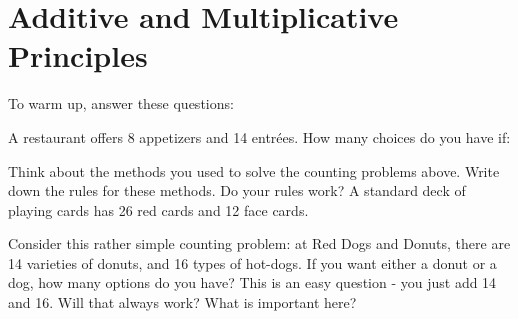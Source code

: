 \documentclass[12pt]{article}
\begin{document}
\newpage
\section{Additive and Multiplicative Principles}

\begin{activity}
To warm up, answer these questions:
\begin{questions}
\question A restaurant offers 8 appetizers and 14 entr\'ees.  How many choices do you have if:
\question Think about the methods you used to solve the counting problems above.  Write down the rules for these methods.
\question Do your rules work?  A standard deck of playing cards has 26 red cards and 12 face cards.

\end{questions}

\end{activity}


Consider this rather simple counting problem: at Red Dogs and Donuts, there are 14 varieties of donuts, and 16 types of hot-dogs.  If you want either a donut or a dog, how many options do you have?  This is an easy question - you just add 14 and 16.  Will that always work?  What is important here?
\end{document}
